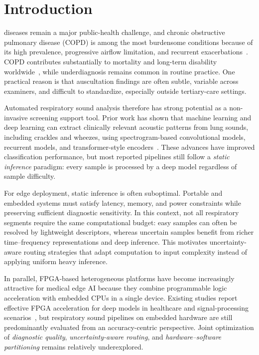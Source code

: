 \section{Introduction}
\label{sec:introduction}
 diseases remain a major public-health challenge, and chronic obstructive pulmonary disease (COPD) is among the most burdensome conditions because of its high prevalence, progressive airflow limitation, and recurrent exacerbations~\cite{b01}. COPD contributes substantially to mortality and long-term disability worldwide~\cite{b02,b03}, while underdiagnosis remains common in routine practice. One practical reason is that auscultation findings are often subtle, variable across examiners, and difficult to standardize, especially outside tertiary-care settings.

Automated respiratory sound analysis therefore has strong potential as a non-invasive screening support tool. Prior work has shown that machine learning and deep learning can extract clinically relevant acoustic patterns from lung sounds, including crackles and wheezes, using spectrogram-based convolutional models, recurrent models, and transformer-style encoders~\cite{b07,b08,b09,b10,b11,b12,b13,b14,b15}. These advances have improved classification performance, but most reported pipelines still follow a \emph{static inference} paradigm: every sample is processed by a deep model regardless of sample difficulty.

For edge deployment, static inference is often suboptimal. Portable and embedded systems must satisfy latency, memory, and power constraints while preserving sufficient diagnostic sensitivity. In this context, not all respiratory segments require the same computational budget: easy samples can often be resolved by lightweight descriptors, whereas uncertain samples benefit from richer time--frequency representations and deep inference. This motivates uncertainty-aware routing strategies that adapt computation to input complexity instead of applying uniform heavy inference.

In parallel, FPGA-based heterogeneous platforms have become increasingly attractive for medical edge AI because they combine programmable logic acceleration with embedded CPUs in a single device. Existing studies report effective FPGA acceleration for deep models in healthcare and signal-processing scenarios~\cite{zhu2023,fazilat2023}, but respiratory sound pipelines on embedded hardware are still predominantly evaluated from an accuracy-centric perspective. Joint optimization of \emph{diagnostic quality}, \emph{uncertainty-aware routing}, and \emph{hardware--software partitioning} remains relatively underexplored.

